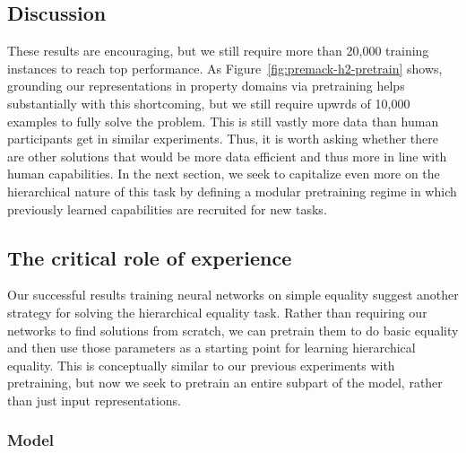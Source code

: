 \documentclass{article}
\newcommand{\figref}[1]{Figure~\ref{#1}}
\newcommand{\update}[1]{{\color{darkblue}#1}}
\begin{document}
\subsection{Discussion}

These results are encouraging, but we still require more than 20,000 training instances to reach top performance. \update{As \figref{fig:premack-h2-pretrain} shows, grounding our representations in property domains via pretraining helps substantially with this shortcoming, but we still require upwrds of 10,000 examples to fully solve the problem. This is still vastly more data than human participants get in similar experiments.}  Thus, it is worth asking whether there are other solutions that would be more data efficient and thus more in line with human capabilities.  In the next section, we seek to capitalize even more on the hierarchical nature of this task by defining a modular pretraining regime in which previously learned capabilities are recruited for new tasks.


\subsection{The critical role of experience}\label{sec:modular}

Our successful results training neural networks on simple equality suggest another strategy for solving the hierarchical equality task. Rather than requiring our networks to find solutions from scratch, we can pretrain them to do basic equality and then use those parameters as a starting point for learning hierarchical equality. \update{This is conceptually similar to our previous experiments with pretraining, but now we seek to pretrain an entire subpart of the model, rather than just input representations.}


\subsubsection{Model}
\end{document}
